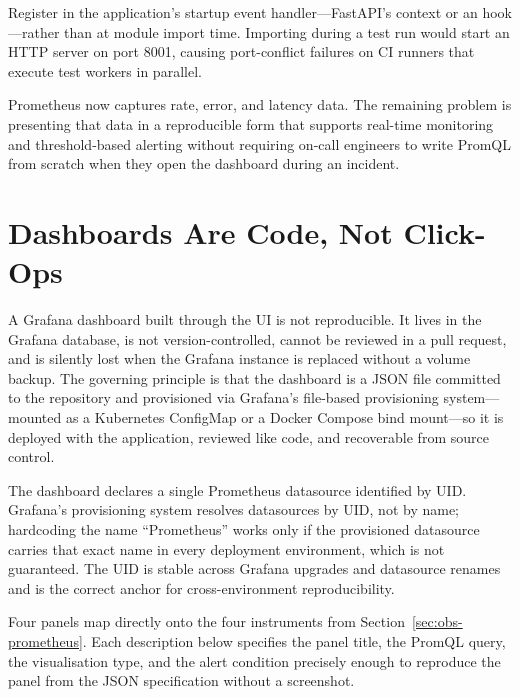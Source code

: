 \begin{tipbox}
Register  in the application's startup
event handler---FastAPI's  context or an
 hook---rather than at module import
time. Importing  during a test run would
start an HTTP server on port 8001, causing port-conflict failures on CI
runners that execute test workers in parallel.
\end{tipbox}

Prometheus now captures rate, error, and latency data. The remaining
problem is presenting that data in a reproducible form that supports
real-time monitoring and threshold-based alerting without requiring
on-call engineers to write PromQL from scratch when they open the
dashboard during an incident.


\section{Dashboards Are Code, Not Click-Ops}
\label{sec:obs-grafana}

A Grafana dashboard built through the UI is not reproducible. It lives
in the Grafana database, is not version-controlled, cannot be reviewed
in a pull request, and is silently lost when the Grafana instance is
replaced without a volume backup. The governing principle is that the
dashboard is a JSON file committed to the repository and provisioned
via Grafana's file-based provisioning system---mounted as a Kubernetes
ConfigMap or a Docker Compose bind mount---so it is deployed with the
application, reviewed like code, and recoverable from source control.

The dashboard declares a single Prometheus datasource identified by UID.
Grafana's provisioning system resolves datasources by UID, not by
name; hardcoding the name ``Prometheus'' works only if the provisioned
datasource carries that exact name in every deployment environment, which
is not guaranteed. The UID is stable across Grafana upgrades and
datasource renames and is the correct anchor for cross-environment
reproducibility.

Four panels map directly onto the four instruments from
Section~\ref{sec:obs-prometheus}. Each description below specifies
the panel title, the PromQL query, the visualisation type, and the
alert condition precisely enough to reproduce the panel from the JSON
specification without a screenshot.

